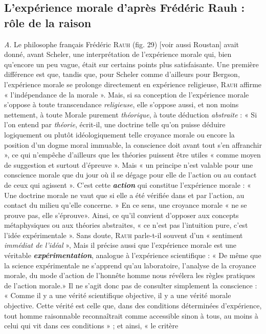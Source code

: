 \subsection{L'expérience morale d’après Frédéric Rauh : rôle de
la raison}%
{\it A}. Le philosophe français Frédéric \textsc{Rauh} (fig. 29)
[voir aussi Roustan] avait donné, avant Scheler, une interprétation
de l’expérience morale qui, bien qu’encore un peu vague, était sur certains
points plus satisfaisante. Une première différence est que, tandis
que, pour Scheler comme d’ailleurs pour Bergson, l’expérience morale
se prolonge directement en expérience religieuse, \textsc{Rauh} affirme « l’indépendance
de la morale ». Mais, si sa conception de l'expérience morale
s’oppose à toute transcendance {\it religieuse}, elle s’oppose aussi, et non
moins nettement, à toute Morale purement {\it théorique}, à toute déduction
{\it abstraite} : « Si l’on entend par {\it théorie}, écrit-il, une doctrine telle qu’on
puisse déduire logiquement ou plutôt idéologiquement telle croyance
morale ou encore la position d’un dogme moral immuable, la conscience
doit avant tout s’en affranchir », ce qui n’empêche d’ailleurs que
les théories puissent être utiles « comme moyen de suggestion et surtout
d’épreuve ». Mais « un principe n’est valable pour une
conscience morale que du jour où il se dégage pour elle de
l’action ou au contact de ceux qui agissent ». C’est cette \textbf{\textit {action}}
qui constitue l’expérience morale : « Une doctrine morale
ne vaut que si elle a été vérifiée dans et par l’action, au
contact du milieu qu’elle concerne. » En ce sens, une croyance
morale « ne se prouve pas, elle s’éprouve». Ainsi, ce qu’il convient
d’opposer aux concepts métaphysiques ou aux théories abstraites, « ce n’est pas
l'intuition pure, c’est l’idée expérimentale ». Sans doute,
\textsc{Rauh} parle-t-il souvent d’un « sentiment {\it immédiat de l'idéal} »,
Mais il précise aussi que l’expérience morale est une véritable
\textbf{\textit {expérimentation}}, analogue à l'expérience scientifique : « De
même que la science expérimentale ne s’apprend qu’au laboratoire,
l’analyse de la croyance morale, du mode d’action de
l’honnête homme nous révélera les règles pratiques de l’action
morale.» Il ne s’agit donc pas de
consulter simplement la conscience : « Comme il y a une
vérité scientifique objective, il y a une vérité morale objective. Cette
vérité est celle que, dans des conditions déterminées d’expérience,
tout homme raisonnable reconnaîtrait comme accessible sinon à tous,
au moins à celui qui vit dans ces conditions » ; et ainsi, « le critère

